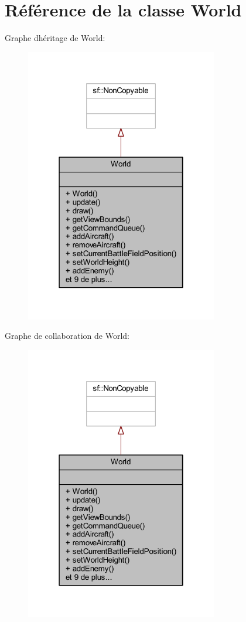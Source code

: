 \hypertarget{class_world}{}\section{Référence de la classe World}
\label{class_world}


Graphe d\textquotesingle{}héritage de World\+:\nopagebreak
\begin{figure}[H]
\begin{center}
\leavevmode
\includegraphics[width=238pt]{class_world__inherit__graph}
\end{center}
\end{figure}


Graphe de collaboration de World\+:\nopagebreak
\begin{figure}[H]
\begin{center}
\leavevmode
\includegraphics[width=238pt]{class_world__coll__graph}
\end{center}
\end{figure}
